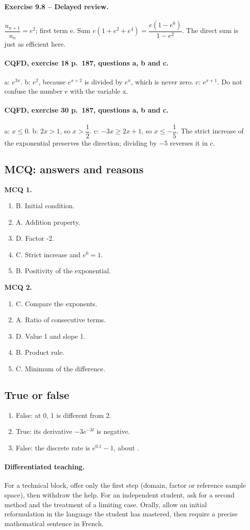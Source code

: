 \paragraph{Exercise 9.8 -- Delayed review.} $\dfrac{u_{n+1}}{u_n}=e^2$; first term e. Sum $e(1+e^2+e^4)=\dfrac{e(1-e^6)}{1-e^2}$. The direct sum is just as efficient here.
\paragraph{CQFD, exercise 18 p.~187, questions a, b and c.} a: $e^{3x}$. b: $e^2$, because $e^{x+2}$ is divided by $e^x$, which is never zero. c: $e^{x+1}$. Do not confuse the number e with the variable x.
\paragraph{CQFD, exercise 30 p.~187, questions a, b and c.} a: $x\leq0$. b: $2x>1$, so $x>\dfrac12$. c: $-3x\geq2x+1$, so $x\leq-\dfrac15$. The strict increase of the exponential preserves the direction; dividing by $-5$ reverses it in c.
\subsection*{MCQ: answers and reasons}
\textbf{MCQ 1.}
\begin{enumerate}
\item B. Initial condition.
\item A. Addition property.
\item D. Factor -2.
\item C. Strict increase and $e^0=1$.
\item B. Positivity of the exponential.
\end{enumerate}
\textbf{MCQ 2.}
\begin{enumerate}
\item C. Compare the exponents.
\item A. Ratio of consecutive terms.
\item D. Value 1 and slope 1.
\item B. Product rule.
\item C. Minimum of the difference.
\end{enumerate}
\subsection*{True or false}
\begin{enumerate}
\item False: at 0, 1 is different from 2.
\item True: its derivative $-3e^{-3t}$ is negative.
\item False: the discrete rate is $e^{\num{0,1}}-1$, about .
\end{enumerate}
\paragraph{Differentiated teaching.} For a technical block, offer only the first step (domain, factor or reference sample space), then withdraw the help. For an independent student, ask for a second method and the treatment of a limiting case. Orally, allow an initial reformulation in the language the student has mastered, then require a precise mathematical sentence in French.
